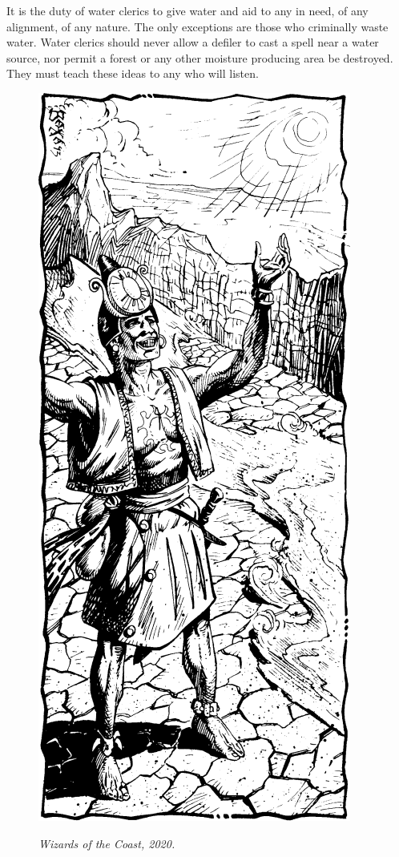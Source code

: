 It is the duty of water clerics to give water and aid to any in need, of any alignment, of any nature. The only exceptions are those who criminally waste water. Water clerics should never allow a defiler to cast a spell near a water source, nor permit a forest or any other moisture producing area be destroyed. They must teach these ideas to any who will listen.

\begin{figure}[b!]
\centering
\includegraphics[width=\columnwidth]{images/cleric-3.png}
\par\textit{\small\textcopyright Wizards of the Coast, 2020.}
\end{figure}

